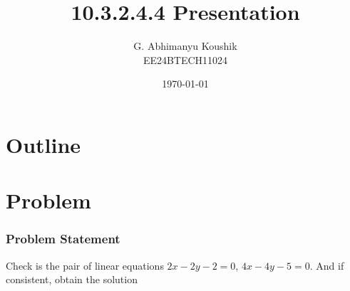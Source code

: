 \documentclass{beamer}
\title{10.3.2.4.4 Presentation}
\author{G. Abhimanyu Koushik \\ EE24BTECH11024}
\date{\today}
\theoremstyle{remark}
\numberwithin{equation}{section}
\begin{document}
\begin{frame}
\titlepage
\end{frame}

\section*{Outline}
\begin{frame}
\tableofcontents
\end{frame}
\section{Problem}
\begin{frame}
\frametitle{Problem Statement}
%
Check is the pair of linear equations $2x-2y-2=0$, $4x-4y-5=0$. And if consistent, obtain the solution
%
\end{frame}

\end{document}
